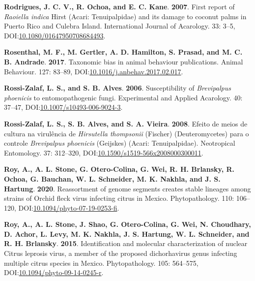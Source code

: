 \documentclass[12pt,final,CPage]{ufthesis}
\newlength{\cslhangindent}
\newenvironment{CSLReferences}[2] %
{%
	\setlength{\parindent}{0pt}
	\ifodd #1 \everypar{\setlength{\hangindent}{\cslhangindent}}\ignorespaces\fi
	\ifnum #2 > 0
	\setlength{\parskip}{#2\baselineskip}
	\fi
}%
{}
\begin{document}
{\begin{CSLReferences}{1}{0}
  \leavevmode{}%
  \textbf{Rodrigues, J. C. V., R. Ochoa, and E. C. Kane}. \textbf{2007}. First report of {\emph{Raoiella indica}} {Hirst} ({Acari}: {Tenuipalpidae}) and its damage to coconut palms in {Puerto Rico} and {Culebra Island}. International Journal of Acarology. 33: 3--5, DOI:\href{https://doi.org/10.1080/01647950708684493}{10.1080/01647950708684493}.

  \leavevmode{}%
  \textbf{Rosenthal, M. F., M. Gertler, A. D. Hamilton, S. Prasad, and M. C. B. Andrade}. \textbf{2017}. Taxonomic bias in animal behaviour publications. Animal Behaviour. 127: 83--89, DOI:\href{https://doi.org/10.1016/j.anbehav.2017.02.017}{10.1016/j.anbehav.2017.02.017}.

  \leavevmode{}%
  \textbf{Rossi-Zalaf, L. S., and S. B. Alves}. \textbf{2006}. Susceptibility of {\emph{Brevipalpus phoenicis}} to entomopathogenic fungi. Experimental and Applied Acarology. 40: 37--47, DOI:\href{https://doi.org/10.1007/s10493-006-9024-3}{10.1007/s10493-006-9024-3}.

  \leavevmode{}%
  \textbf{Rossi-Zalaf, L. S., S. B. Alves, and S. A. Vieira}. \textbf{2008}. Efeito de meios de cultura na virul{ê}ncia de {\emph{Hirsutella thompsonii}} ({Fischer}) ({Deuteromycetes}) para o controle {\emph{Brevipalpus phoenicis}} ({Geijskes}) ({Acari}: {Tenuipalpidae}). Neotropical Entomology. 37: 312--320, DOI:\href{https://doi.org/10.1590/s1519-566x2008000300011}{10.1590/s1519-566x2008000300011}.

  \leavevmode{}%
  \textbf{Roy, A., A. L. Stone, G. Otero-Colina, G. Wei, R. H. Brlansky, R. Ochoa, G. Bauchan, W. L. Schneider, M. K. Nakhla, and J. S. Hartung}. \textbf{2020}. Reassortment of genome segments creates stable lineages among strains of {Orchid fleck virus} infecting citrus in {Mexico}. Phytopathology{\textregistered}. 110: 106--120, DOI:\href{https://doi.org/10.1094/phyto-07-19-0253-fi}{10.1094/phyto-07-19-0253-fi}.

  \leavevmode{}%
  \textbf{Roy, A., A. L. Stone, J. Shao, G. Otero-Colina, G. Wei, N. Choudhary, D. Achor, L. Levy, M. K. Nakhla, J. S. Hartung, W. L. Schneider, and R. H. Brlansky}. \textbf{2015}. Identification and molecular characterization of nuclear {Citrus leprosis virus}, a member of the proposed dichorhavirus genus infecting multiple citrus species in {Mexico}. Phytopathology{\textregistered}. 105: 564--575, DOI:\href{https://doi.org/10.1094/phyto-09-14-0245-r}{10.1094/phyto-09-14-0245-r}.


\end{CSLReferences}}
\end{document}
